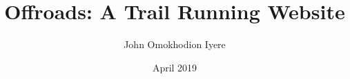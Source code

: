\documentclass{report}
\title{Offroads: A Trail Running Website}
\author{John Omokhodion Iyere }
\date{April 2019}
\begin{document}
\maketitle


\tableofcontents
\listoffigures
\listoftables
\listoflistings

\newpage











\printglossary
\printglossary[type=\acronymtype]

\printbibliography[heading=bibintoc]

\begin{appendices}
    
    
\end{appendices}
\end{document}
